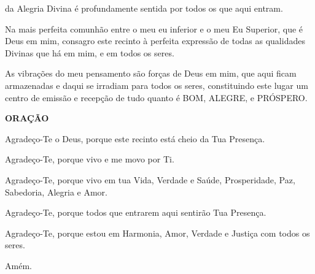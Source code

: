 \begin{passage}[PT]{}
    da Alegria Divina é profundamente sentida por todos
    os que aqui entram.
    \par
    Na mais perfeita comunhão entre o meu eu inferior
    e o meu Eu Superior, que é Deus em mim, consagro
    este recinto à perfeita expressão de todas as
    qualidades Divinas que há em mim, e em todos os
    seres.
    \par
    As vibrações do meu pensamento são forças de Deus
    em mim, que aqui ficam armazenadas e daqui se
    irradiam para todos os seres, constituindo este
    lugar um centro de emissão e recepção de tudo
    quanto é BOM, ALEGRE, e PRÓSPERO.
    \par
    \vspace{1ex}
    \textbf{ORAÇÃO}
    \par
    Agradeço-Te o Deus, porque este recinto está cheio
    da Tua Presença.
    \par
    Agradeço-Te, porque vivo e me movo por Ti.
    \par
    Agradeço-Te, porque vivo em tua Vida, Verdade e
    Saúde, Prosperidade, Paz, Sabedoria, Alegria e Amor.
    \par
    Agradeço-Te, porque todos que entrarem aqui sentirão
    Tua Presença.
    \par
    Agradeço-Te, porque estou em Harmonia, Amor, Verdade
    e Justiça com todos os seres.
    \par
    Amém.
  \end{passage}
